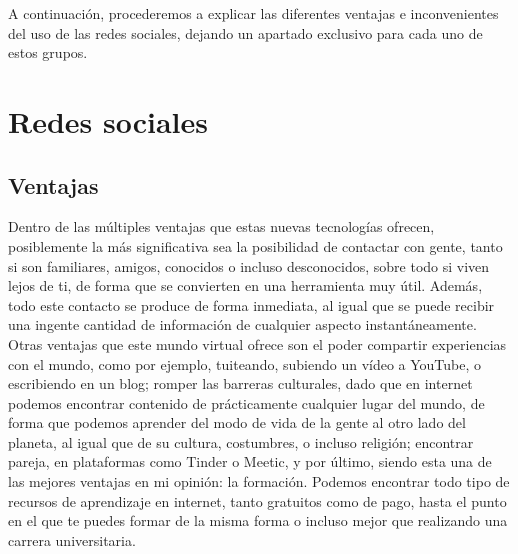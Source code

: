 \documentclass[12pt,a4paper]{article}
\begin{document}
\begin{figure}[h]
	\centering
\end{figure}

A continuación, procederemos a explicar las diferentes ventajas e inconvenientes del uso de las redes sociales, dejando un apartado exclusivo para cada uno de estos grupos.

\section{Redes sociales}

\subsection{Ventajas}

Dentro de las múltiples ventajas que estas nuevas tecnologías ofrecen, posiblemente la más significativa sea la posibilidad de contactar con gente, tanto si son familiares, amigos, conocidos o incluso desconocidos, sobre todo si viven lejos de ti, de forma que se convierten en una herramienta muy útil. Además, todo este contacto se produce de forma inmediata, al igual que se puede recibir una ingente cantidad de información de cualquier aspecto instantáneamente.\\

Otras ventajas que este mundo virtual ofrece son el poder compartir experiencias con el mundo, como por ejemplo, tuiteando, subiendo un vídeo a YouTube, o escribiendo en un blog; romper las barreras culturales, dado que en internet podemos encontrar contenido de prácticamente cualquier lugar del mundo, de forma que podemos aprender del modo de vida de la gente al otro lado del planeta, al igual que de su cultura, costumbres, o incluso religión; encontrar pareja, en plataformas como Tinder o Meetic, y por último, siendo esta una de las mejores ventajas en mi opinión: la formación. Podemos encontrar todo tipo de recursos de aprendizaje en internet, tanto gratuitos como de pago, hasta el punto en el que te puedes formar de la misma forma o incluso mejor que realizando una carrera universitaria.
\end{document}
